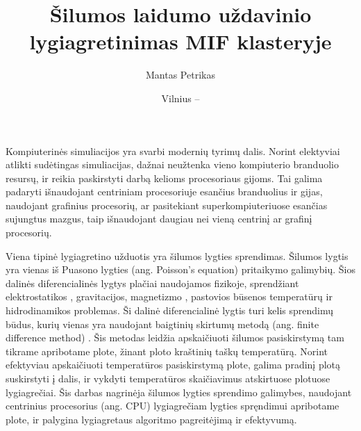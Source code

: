 \documentclass{VUMIFPSbakalaurinis}
\title{Šilumos laidumo uždavinio lygiagretinimas MIF klasteryje}
\author{Mantas Petrikas}
\date{Vilnius – \the\year}
\begin{document}
\maketitle



\tableofcontents



Kompiuterinės simuliacijos yra svarbi modernių tyrimų dalis. 
Norint elektyviai atlikti sudėtingas simuliacijas, dažnai neužtenka vieno kompiuterio branduolio resursų, ir reikia paskirstyti darbą kelioms procesoriaus gijoms.
Tai galima padaryti išnaudojant centriniam procesoriuje esančius branduolius ir gijas, naudojant grafinius procesorių, ar pasitekiant superkompiuteriuose esančias sujungtus mazgus, taip išnaudojant daugiau nei vieną  centrinį ar grafinį procesorių.

Viena tipinė lygiagretino užduotis yra šilumos lygties sprendimas. 
Šilumos lygtis yra vienas iš Puasono lygties (ang. Poisson's equation) pritaikymo galimybių. 
Šios dalinės diferencialinės lygtys plačiai naudojamos fizikoje, sprendžiant elektrostatikos \cite{house2008analytic}, gravitacijos, magnetizmo \cite{blakely1996potential}, pastovios būsenos temperatūrų \cite {berntsson2001numerical} ir hidrodinamikos \cite{kadanoff1985simulating} problemas. 
Ši dalinė diferencialinė lygtis turi kelis sprendimų būdus, kurių vienas yra naudojant baigtinių skirtumų metodą (ang. finite difference method) \cite{yoon2015analyses}.
Šis metodas leidžia apskaičiuoti šilumos pasiskirstymą tam tikrame apribotame plote, žinant ploto kraštinių taškų temperatūrą.
Norint efektyviau apskaičiuoti temperatūros pasiskirstymą plote, galima pradinį plotą suskirstyti į dalis, ir vykdyti temperatūros skaičiavimus atskirtuose plotuose lygiagrečiai.
Šis darbas nagrinėja šilumos lygties sprendimo galimybes, naudojant centrinius procesorius (ang. CPU) lygiagrečiam lygties spręndimui apribotame plote, ir palygina lygiagretaus algoritmo pagreitėjimą ir efektyvumą. 




\end{document}
